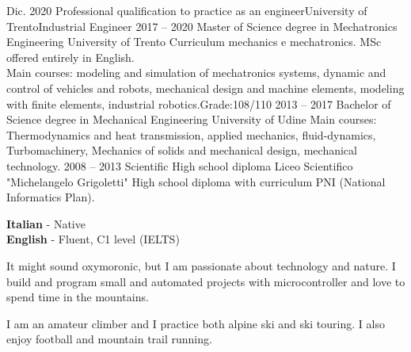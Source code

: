 \documentclass[9pt]{developercv} %
\begin{document}
\begin{entrylist}
	\entry
		{Dic. 2020}
		{Professional qualification to practice as an engineer}{University of Trento}{Industrial Engineer}
	\entry
		{2017 -- 2020}
		{Master of Science degree in Mechatronics Engineering}
		{University of Trento}
		{Curriculum mechanics e mechatronics. MSc offered entirely in English.\\
		Main courses: modeling and simulation of mechatronics systems, dynamic and control of vehicles and robots, mechanical design and machine elements, modeling with finite elements, industrial robotics.\hfill Grade:108/110}
	\entry
		{2013 -- 2017}
		{Bachelor of Science degree in Mechanical Engineering}
		{University of Udine}
		{Main courses: Thermodynamics and heat transmission, applied mechanics, fluid-dynamics, Turbomachinery, Mechanics of solids and mechanical design, mechanical technology.} %
	\entry
		{2008 -- 2013}
		{Scientific High school diploma}
		{Liceo Scientifico "Michelangelo Grigoletti"}
		{High school diploma with curriculum PNI (National Informatics Plan). } %
\end{entrylist}
%
%
\begin{minipage}[t]{0.32\textwidth}
	\vspace{-\baselineskip} %
%
	\textbf{Italian} - Native\\
	\textbf{English}  - Fluent, C1 level (IELTS)
%
\end{minipage}
\hfill
\begin{minipage}[t]{0.32\textwidth}
	\vspace{-\baselineskip} %
	It might sound oxymoronic, but I am passionate about technology and nature. 
	I build and program small and automated projects with microcontroller and love to spend time in the mountains.
%
\end{minipage}
\hfill
\begin{minipage}[t]{0.32\textwidth}
	\vspace{-\baselineskip} %
%
	I am an amateur climber and I practice both alpine ski and ski touring. I also enjoy football and mountain trail running. 
%
\end{minipage}

\vfill
\end{document}

